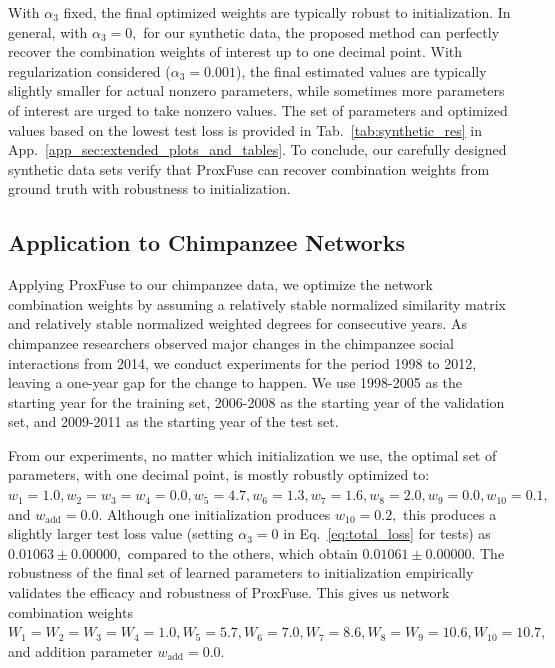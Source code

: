 \documentclass{article}
\theoremstyle{plain}
\theoremstyle{definition}
\theoremstyle{remark}
\begin{document}
With $\alpha_3$ fixed, the final optimized weights are typically robust to initialization. In general, with $\alpha_3=0,$ for our synthetic data, the proposed method can perfectly recover the combination weights of interest up to one decimal point. With regularization considered ($\alpha_3=0.001$), the final estimated values are typically slightly smaller for actual nonzero parameters, while sometimes more parameters of interest are urged to take nonzero values. The set of parameters and optimized values based on the lowest test loss is provided in Tab.~\ref{tab:synthetic_res} in App.~\ref{app_sec:extended_plots_and_tables}. To conclude, our carefully designed synthetic data sets verify that ProxFuse can recover combination weights from ground truth with robustness to initialization.
\subsection{Application to Chimpanzee Networks}
\label{sec:chimp_network_construction}
Applying ProxFuse to our chimpanzee data, we optimize the network combination weights by assuming a relatively stable normalized similarity matrix and relatively stable normalized weighted degrees for consecutive years. As chimpanzee researchers observed major changes in the chimpanzee social interactions from 2014, we conduct experiments for the period 1998 to 2012, leaving a one-year gap for the change to happen. We use 1998-2005 as the starting year for the training set, 2006-2008 as the starting year of the validation set, and 2009-2011 as the starting year of the test set. 

From our experiments, no matter which initialization we use, the optimal set of parameters, with one decimal point, is mostly robustly optimized to: $w_1=1.0, w_2=w_3=w_4=0.0, w_5=4.7, w_6=1.3, w_7=1.6, w_8=2.0, w_9=0.0, w_{10}=0.1,$ and $w_\text{add}=0.0.$ Although one initialization produces $w_{10}=0.2,$ this produces a slightly larger test loss value (setting $\alpha_3=0$ in Eq.~\eqref{eq:total_loss} for tests) as $0.01063\pm 0.00000,$ compared to the others, which obtain $0.01061\pm 0.00000$. The robustness of the final set of learned parameters to initialization empirically validates the efficacy and robustness of ProxFuse. This gives us network combination weights $W_1=W_2=W_3=W_4=1.0, W_5=5.7, W_6=7.0, W_7=8.6, W_8=W_9=10.6, W_{10}=10.7,$ and addition parameter $w_\text{add}=0.0.$
\end{document}
